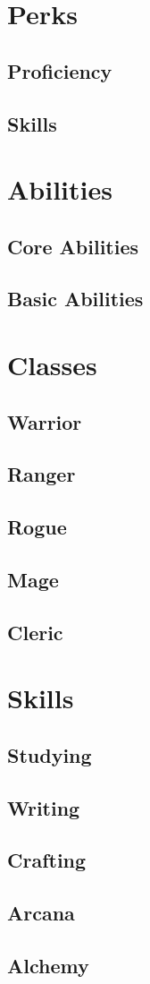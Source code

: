 \chapter{Perks}
\section{Proficiency}
\section{Skills}



\chapter{Abilities}
\section{Core Abilities}
\section{Basic Abilities}



\chapter{Classes}
\section{Warrior}
\section{Ranger}
\section{Rogue}
\section{Mage}
\section{Cleric}



\chapter{Skills}
\section{Studying}
\section{Writing}
\section{Crafting}
\section{Arcana} %
\section{Alchemy}

